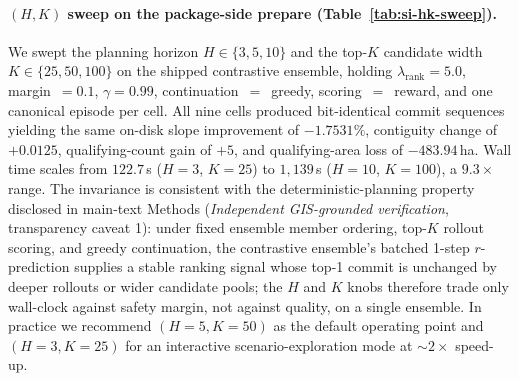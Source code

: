 \documentclass[11pt]{article}
\begin{document}
\paragraph{$(H, K)$ sweep on the package-side prepare (Table~\ref{tab:si-hk-sweep}).} We swept the planning horizon $H \in \{3, 5, 10\}$ and the top-$K$ candidate width $K \in \{25, 50, 100\}$ on the shipped contrastive ensemble, holding $\lambda_{\text{rank}}=5.0$, margin~$=0.1$, $\gamma=0.99$, continuation~$=$~greedy, scoring~$=$~reward, and one canonical episode per cell. All nine cells produced bit-identical commit sequences yielding the same on-disk slope improvement of $-1.7531\%$, contiguity change of $+0.0125$, qualifying-count gain of $+5$, and qualifying-area loss of $-483.94$\,ha. Wall time scales from $122.7$\,s ($H{=}3$, $K{=}25$) to $1{,}139$\,s ($H{=}10$, $K{=}100$), a $9.3\times$ range. The invariance is consistent with the deterministic-planning property disclosed in main-text Methods (\emph{Independent GIS-grounded verification}, transparency caveat 1): under fixed ensemble member ordering, top-$K$ rollout scoring, and greedy continuation, the contrastive ensemble's batched 1-step $r$-prediction supplies a stable ranking signal whose top-1 commit is unchanged by deeper rollouts or wider candidate pools; the $H$ and $K$ knobs therefore trade only wall-clock against safety margin, not against quality, on a single ensemble. In practice we recommend $(H{=}5, K{=}50)$ as the default operating point and $(H{=}3, K{=}25)$ for an interactive scenario-exploration mode at $\sim 2\times$ speed-up.
\end{document}
